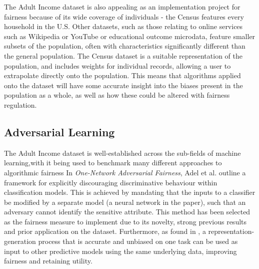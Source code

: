 \documentclass[conference]{IEEEtran}
\begin{document}
The Adult Income dataset is also appealing as an implementation project for fairness because of its wide coverage of individuals - the Census features every household in the U.S. Other datasets, such as those relating to online services such as Wikipedia or YouTube or educational outcome microdata, feature smaller subsets of the population, often with characteristics significantly different than the general population. The Census dataset is a suitable representation of the population, and includes weights for individual records, allowing a user to extrapolate directly onto the population. This means that algorithms applied onto the dataset will have some accurate insight into the biases present in the population as a whole, as well as how these could be altered with fairness regulation.
\subsection{Adversarial Learning}
The Adult Income dataset is well-established across the sub-fields of machine learning,with it being used to benchmark many different approaches to algorithmic fairness In \emph{One-Network Adversarial Fairness}, Adel et al. outline a framework for explicitly discouraging discriminative behaviour within classification models\cite{Adel_Valera_Ghahramani_Weller_2019}. This is achieved by mandating that the inputs to a classifier be modified by a separate model (a neural network in the paper), such that an adversary cannot identify the sensitive attribute. This method has been selected as the fairness measure to implement due to its novelty, strong previous results and prior application on the dataset. Furthermore, as found in \cite{DBLP:journals/corr/abs-1802-06309}, a representation-generation process that is accurate and unbiased on one task can be used as input to other predictive models using the same underlying data, improving fairness and retaining utility.
\end{document}
